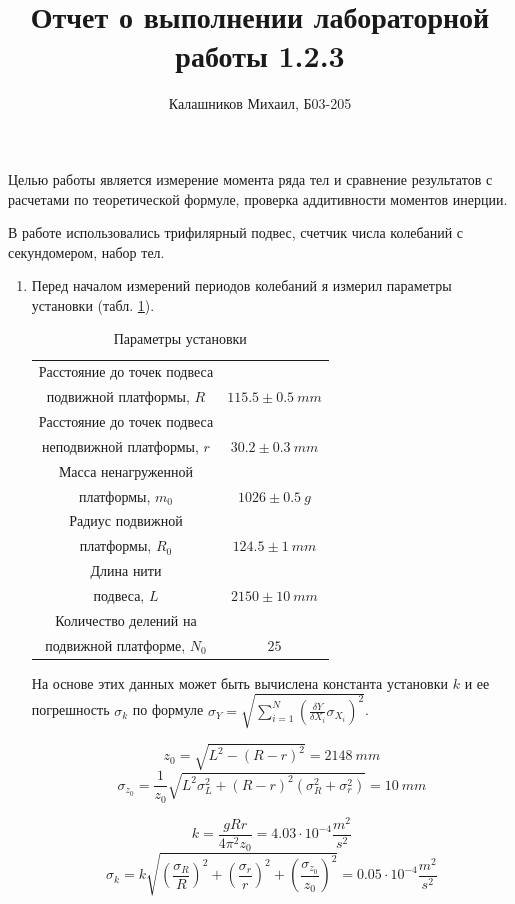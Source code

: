 \documentclass[14pt, a4paper]{article}
\title{\textbf{Отчет о выполнении лабораторной работы 1.2.3}}
\author{Калашников Михаил, Б03-205}
\date{}
\begin{document}
\maketitle

Целью работы является измерение момента ряда тел и сравнение результатов с расчетами по теоретической формуле, проверка аддитивности моментов инерции.

В работе использовались трифилярный подвес, счетчик числа колебаний с секундомером, набор тел.

\begin{enumerate}

\item Перед началом измерений периодов колебаний я измерил параметры установки (табл. \ref{table1}).

\begin{table}[h]
\centering
\begin{tabular}{| c | c |}
\hline
Расстояние до точек подвеса & \\
подвижной платформы, $R$ & $115.5\pm 0.5\ mm$ \\
Расстояние до точек подвеса & \\
неподвижной платформы, $r$ & $30.2\pm 0.3\ mm$ \\
Масса ненагруженной & \\
платформы, $m_0$ & $1026\pm 0.5\ g$ \\
Радиус подвижной & \\
платформы, $R_0$ & $124.5\pm 1\ mm$ \\
Длина нити & \\
подвеса, $L$ & $2150\pm 10\ mm$ \\
Количество делений на & \\
подвижной платформе, $N_0$ & $25$ \\
\hline
\end{tabular}
\label{table1}
\caption{Параметры установки}
\end{table}

На основе этих данных может быть вычислена константа установки $k$ и ее погрешность $\sigma_k$ по формуле $\sigma_Y=\sqrt{\sum_{i=1}^N\left(\frac{\delta Y}{\delta X_i}\sigma_{X_i}\right)^2}$.

\[z_0=\sqrt{L^2-(R-r)^2}=2148\ mm\]
\[\sigma_{z_0}=\frac{1}{z_0}\sqrt{L^2\sigma_L^2+(R-r)^2(\sigma_R^2+\sigma_r^2)}=10\ mm\]

\[k=\frac{gRr}{4\pi^2z_0}=4.03\cdot10^{-4}\frac{m^2}{s^2}\]
\[\sigma_k=k\sqrt{\left(\frac{\sigma_R}{R}\right)^2+\left(\frac{\sigma_r}{r}\right)^2+\left(\frac{\sigma_{z_0}}{z_0}\right)^2}=0.05\cdot10^{-4}\frac{m^2}{s^2}\]


\end{enumerate}
\end{document}

